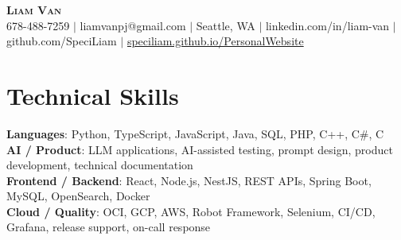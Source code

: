 \documentclass[letterpaper,11pt]{article}
\begin{document}

%
\begin{center}
    \textbf{\Huge \scshape Liam Van} \\ \vspace{1pt}
    \small 678-488-7259 $|$ \small {liamvanpj@gmail.com} $|$ Seattle, WA
 {{$|$ linkedin.com/in/liam-van} {$|$ github.com/SpeciLiam} {$|$ \href{https://speciliam.github.io/PersonalWebsite}{speciliam.github.io/PersonalWebsite}}}

\end{center}

\section{Technical Skills}
 \begin{itemize}[leftmargin=0.15in, label={}]
    \small{\item{
     \textbf{Languages}{: Python, TypeScript, JavaScript, Java, SQL, PHP, C++, C\#, C} \\
     \textbf{AI / Product}{: LLM applications, AI-assisted testing, prompt design, product development, technical documentation} \\
     \textbf{Frontend / Backend}{: React, Node.js, NestJS, REST APIs, Spring Boot, MySQL, OpenSearch, Docker} \\
     \textbf{Cloud / Quality}{: OCI, GCP, AWS, Robot Framework, Selenium, CI/CD, Grafana, release support, on-call response} \\
    }}
 \end{itemize}
%
\end{document}

